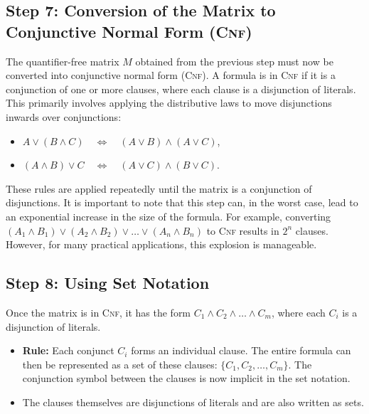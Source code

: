 \subsection{Step 7: Conversion of the Matrix to Conjunctive Normal Form (\textsc{Cnf})}

The quantifier-free matrix $M$ obtained from the previous step must now be converted into conjunctive normal form (\textsc{Cnf}). A formula is in \textsc{Cnf} if it is a conjunction of one or more clauses, where each clause is a disjunction of literals. This primarily involves applying the distributive laws to move disjunctions inwards over conjunctions:
\begin{itemize}
\item $A \lor (B \land C) \quad\Leftrightarrow\quad (A \lor B) \land (A \lor C)$,
\item $(A \land B) \lor C \quad\Leftrightarrow\quad (A \lor C) \land (B \lor C)$.
\end{itemize}
These rules are applied repeatedly until the matrix is a conjunction of disjunctions. It is important to note
that this step can, in the worst case, lead to an exponential increase in the size of the formula. For example,
converting $(A_1 \land B_1) \lor (A_2 \land B_2) \lor \dots \lor (A_n \land B_n)$ to \textsc{Cnf} results in
$2^n$ clauses. However, for many practical applications, this explosion is manageable. 


\subsection{Step 8: Using Set Notation}
Once the matrix is in \textsc{Cnf}, it has the form $C_1 \land C_2 \land \dots \land C_m$, where each $C_i$ is a disjunction of literals.
\begin{itemize}
\item \textbf{Rule:} Each conjunct $C_i$ forms an individual clause. The entire formula can then be
      represented as a set of these clauses: $\{C_1, C_2, \dots, C_m\}$. The conjunction symbol between the
      clauses is now implicit in the set notation.
\item The clauses themselves are disjunctions of literals and are also written as sets.
\end{itemize}

